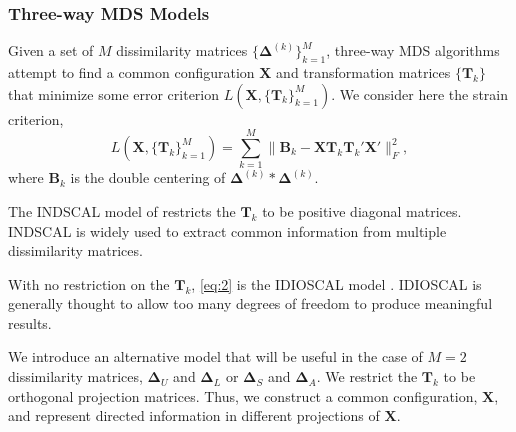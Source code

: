 \documentclass[professionalfonts, hyperref={pdfpagelabels=false,
  colorlinks=true, linkcolor=purple}]{beamer}
\begin{document}
\begin{frame}
  \frametitle{Three-way MDS Models}
  Given a set of $M$ dissimilarity matrices
  $\{\bm{\Delta}^{(k)}\}_{k=1}^{M}$, three-way MDS algorithms attempt
  to find a common configuration $\mathbf{X}$ and transformation
  matrices $\{\mathbf{T}_k\}$ that minimize some error criterion 
  $L(\mathbf{X},
  \{\mathbf{T}_k\}_{k=1}^{M})$. We consider here the strain criterion, 
  \begin{equation}
    \label{eq:4}
    L(\mathbf{X}, \{\mathbf{T}_k\}_{k=1}^{M}) = \sum_{k = 1}^{M}\| \mathbf{B}_k -
    \mathbf{X}\mathbf{T}_k \mathbf{T}_k' \mathbf{X}' \|_F^2, 
  \end{equation}
  where $\mathbf{B}_k$ is the double centering of $\bm{\Delta}^{(k)}
  \ast \bm{\Delta}^{(k)}$.
\end{frame}
\begin{frame}
  The INDSCAL model of \cite{carroll70:_analy_n_eckar_young}
  restricts the $\mathbf{T}_k$ to be positive diagonal
  matrices. INDSCAL is widely used to extract common information from
  multiple dissimilarity matrices.
  
  \vskip10pt With no restriction on the $\mathbf{T}_k$, \eqref{eq:2}
  is the IDIOSCAL model \cite{carroll74:_contem}. IDIOSCAL is
  generally thought to allow too many degrees of freedom to produce
  meaningful results. 
  
  \vskip10pt We introduce an alternative model that will be useful in
  the case of $M = 2$ dissimilarity matrices, $\bm{\Delta}_{U}$ and
  $\bm{\Delta}_{L}$ or $\bm{\Delta}_{S}$ and $\bm{\Delta}_{A}$. We
  restrict the $\mathbf{T}_k$ to be orthogonal projection
  matrices. Thus, we construct a common configuration, $\mathbf{X}$,
  and represent directed information in different projections of
  $\mathbf{X}$.
\end{frame}
\end{document}
